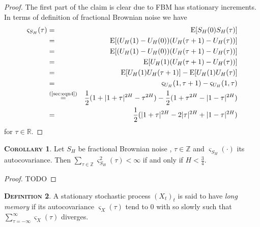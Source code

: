 \documentclass[a4paper, twoside, 11pt]{article}
\theoremstyle{definition}
\newtheorem{definition}{\scshape Definition}[section]
\newtheorem{corollary}[definition]{\scshape Corollary}
\begin{document}
\begin{proof}
  The first part of the claim is clear due to FBM has stationary increments.\\
  In terms of definition of fractional Brownian noise we have
  \begin{eqnarray*}
	\varsigma_{S_H}(\tau) &=& \mathrm{E}[S_H(0)S_H(\tau)] \\
	&=& \mathrm{E}[(U_H(1) - U_H(0))(U_H(\tau+1)-U_H(\tau))]\\
	&=& \mathrm{E}[(U_H(1) - U_H(0))(U_H(\tau+1)-U_H(\tau))]\\
    &=& \mathrm{E}[U_H(1)(U_H(\tau+1)-U_H(\tau))]\\
	&=& \mathrm{E}[U_H(1)U_H(\tau+1)] - \mathrm{E}[U_H(1)U_H(\tau)]\\
	&=& \varsigma_{U_H}(1, \tau+1) - \varsigma_{U_H}(1, \tau)\\
	&\overset{\text{(\ref{sec:eqn4})}}{=}& \frac{1}{2} (1 + |1+\tau|^{2H} - \tau^{2H}) - \frac{1}{2}(1 + \tau^{2H} - |1 - \tau|^{2H})\\
	&=& \frac{1}{2}(|1+\tau|^{2H} - 2|\tau|^{2H} + |1-\tau|^{2H})
  \end{eqnarray*}
  for $\tau \in \mathbb{R}$.
\end{proof}

\begin{corollary}
  Let $S_H$ be fractional Brownian noise , $\tau\in\mathbb{Z}$ and $\varsigma_{S_H}(\cdot)$ its autocovariance. Then $\sum_{\tau\in\mathbb{Z}}\varsigma^2_{S_H}(\tau)<\infty$ if and only if $H < \frac{3}{4}$.
\end{corollary}
\begin{proof}
  TODO
\end{proof}
\begin{definition}
  A stationary stochastic process $(X_t)_t$ is said to have \emph{long memory} if its autocovariance $\varsigma_X(\tau)$ tend to $0$  with so slowly such that
  $ \sum_{\tau = -\infty} ^{\infty} \varsigma_X(\tau)$ diverges.
\end{definition}
\end{document}
